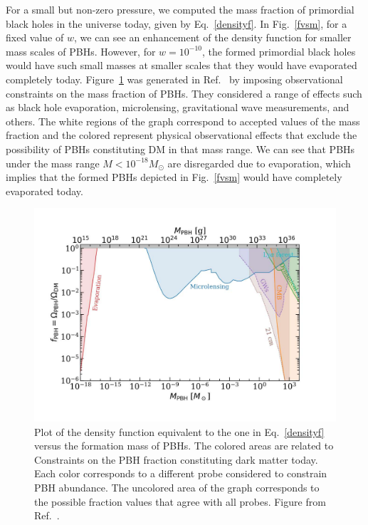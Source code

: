 \documentclass[a4paper,11pt]{article}
\begin{document}
For a small but non-zero pressure, we computed the mass fraction of primordial black
holes in the universe today, given by Eq.~\eqref{densityf}. In Fig.~\ref{fvsm}, for a
fixed value of $w$, we can see an enhancement of the density function for smaller mass
scales of PBHs. However, for $w = 10^{-10}$, the formed primordial black holes would
have such small masses at smaller scales that they would have evaporated completely
today. Figure~\ref{fig:pbhdm} was generated in Ref.~\cite{Villanueva2021} by imposing
observational constraints on the mass fraction of PBHs. They considered a range of
effects such as black hole evaporation, microlensing, gravitational wave measurements,
and others. The white regions of the graph correspond to accepted values of the mass
fraction and the colored represent physical observational effects that exclude the
possibility of PBHs constituting DM in that mass range. We can see that PBHs under the
mass range $M <  10^{-18}M_\odot$ are disregarded due to evaporation, which implies that
the formed PBHs depicted in Fig.~\ref{fvsm} would have completely evaporated today.

\begin{figure}[tbp]
	\centering
	\includegraphics[width=1.0\linewidth]{pbh_dm}
	\caption{Plot of the density function equivalent to the one in Eq.~\eqref{densityf} versus the formation mass of PBHs. The colored areas are related to Constraints on the PBH fraction constituting dark matter today. Each color corresponds to a different probe considered to constrain PBH abundance. The uncolored area of the graph corresponds to the possible fraction values that agree with all probes. Figure from Ref.~\cite{Villanueva2021}.}
	\label{fig:pbhdm}
\end{figure}
\end{document}
